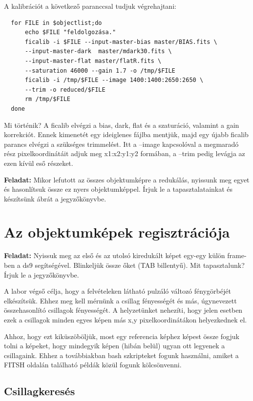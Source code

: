 \documentclass{article}
\begin{document}
A kalibrációt a következő paranccsal tudjuk végrehajtani:

\begin{verbatim}
  for FILE in $objectlist;do
      echo $FILE "feldolgozása."
      ficalib -i $FILE --input-master-bias master/BIAS.fits \
      --input-master-dark  master/mdark30.fits \
      --input-master-flat master/flatR.fits \
      --saturation 46000 --gain 1.7 -o /tmp/$FILE
      ficalib -i /tmp/$FILE --image 1400:1400:2650:2650 \
      --trim -o reduced/$FILE
      rm /tmp/$FILE
  done
\end{verbatim}

Mi történik? A ficalib elvégzi a bias, dark, flat és a szaturáció, valamint a
gain korrekciót. Ennek kimenetét egy ideiglenes fájlba mentjük, majd egy újabb
ficalib parancs elvégzi a szükséges trimmelést. Itt a --image kapcsolóval a
megmaradó rész pixelkoordinátáit adjuk meg x1:x2:y1:y2 formában, a --trim pedig
levágja az  ezen kívül eső részeket.

{\bf Feladat:}
Mikor lefutott az összes objektumképre a redukálás, nyissunk meg egyet és
hasonlítsuk össze ez nyers objektumképpel. Írjuk le a tapasztalatainkat és
készítsünk ábrát a jegyzőkönyvbe.

\section{Az objektumképek regisztrációja}

{\bf Feladat:}
Nyissuk meg az első és az utolsó kiredukált képet egy-egy külön frame-ben a ds9
segítségével. Blinkeljük össze őket (TAB billentyű). Mit tapasztalunk? Írjuk le
a jegyzőkönyvbe.

A labor végső célja, hogy a felvételeken látható pulzáló változó fénygörbéjét
elkészítsük. Ehhez meg kell mérnünk a csillag fényességét és más, úgynevezett
összehasonlító csillagok fényességét. A helyzetünket nehezíti, hogy jelen
esetben ezek a csillagok minden egyes képen más x,y pixelkoordinátákon
helyezkednek el.

Ahhoz, hogy ezt kiküszöböljük, most egy referencia képhez képest össze fogjuk
tolni a képeket, hogy mindegyik képen (hibán belül) ugyan ott legyenek a
csillagaink. Ehhez a továbbiakban bash szkripteket fogunk használni, amiket a
FITSH oldalán található példák közül fogunk kölcsönvenni.

\subsection{Csillagkeresés}
\end{document}
